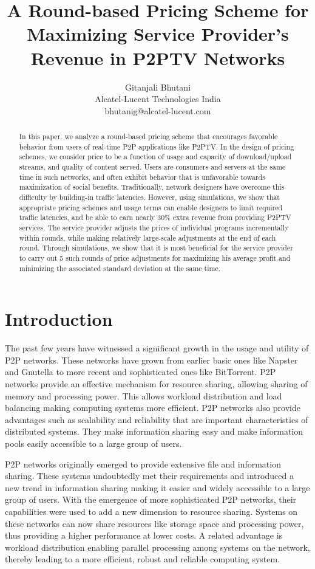 \documentclass[conference,a4paper]{IEEEtran}
\author{Gitanjali Bhutani\\Alcatel-Lucent Technologies India\\ bhutanig@alcatel-lucent.com }
\title{A Round-based Pricing Scheme for Maximizing Service Provider's Revenue in P2PTV Networks}
\date{}
\begin{document}
\maketitle
\begin{abstract}
  In this paper, we analyze a round-based pricing scheme that encourages favorable behavior from users of real-time P2P applications like P2PTV. In the design of pricing schemes, we consider price to be a function of usage and capacity of download/upload streams, and quality of content served. Users are consumers and servers at the same time in such networks, and often exhibit behavior that is unfavorable towards maximization of social benefits. Traditionally, network designers have overcome this difficulty by building-in traffic latencies. However, using simulations, we show that appropriate pricing schemes and usage terms can enable designers to limit required traffic latencies, and be able to earn nearly 30\% extra revenue from providing P2PTV services. The service provider adjusts the prices of individual programs incrementally within rounds, while making relatively large-scale adjustments at the end of each round. Through simulations, we show that it is most beneficial for the service provider to carry out 5 such rounds of price adjustments for maximizing his average profit and minimizing the associated standard deviation at the same time. 
\end{abstract}
\section{Introduction}
\label{sec:introduction}
The past few years have witnessed a significant growth in the usage and utility of P2P networks. These networks have grown from earlier basic ones like Napster and Gnutella to more recent and sophisticated ones like BitTorrent. P2P networks provide an effective mechanism for resource sharing, allowing sharing of memory and processing power. This allows workload distribution and load balancing making computing systems more efficient. P2P networks also provide advantages such as scalability and reliability that are important characteristics of distributed systems. They make information sharing easy and make information pools easily accessible to a large group of users. 

P2P networks originally emerged to provide extensive file and information sharing. These systems undoubtedly met their requirements and introduced a new trend in information sharing making it easier and widely accessible to a large group of users. With the emergence of more sophisticated P2P networks, their capabilities were used to add a new dimension to resource sharing. Systems on these networks can now share resources like storage space and processing power, thus providing a higher performance at lower costs. A related advantage is workload distribution enabling parallel processing among systems on the network, thereby leading to a more efficient, robust and reliable computing system.
\end{document}
